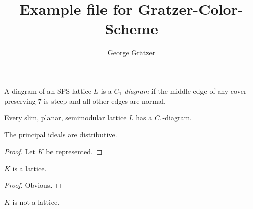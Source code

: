 \documentclass{amsart}
\begin{document}
\title{Example file for Gratzer-Color-Scheme}

\author[G.\ Gr\"atzer]{George Gr\"atzer}


\maketitle    

\begin{definition}
A diagram of an SPS lattice $L$ is a
\emph{${C}_1$-diagram} if the middle edge of any cover-preserving $7$ is steep
and all other edges are normal.
\end{definition}

\begin{theorem}\label{T:well}
Every slim, planar, semimodular lattice $L$ has a ${C}_1$-diagram.
\end{theorem}

\begin{corollary}
The principal ideals are distributive.
\end{corollary}

\begin{proof}
Let $K$ be represented.
\end{proof}

\begin{lemma}
$K$ is a lattice.
\end{lemma}

\begin{proof}
Obvious.
\end{proof}

\begin{proposition}
$K$ is not a lattice.
\end{proposition}
\end{document}
